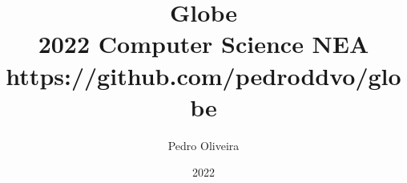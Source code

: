 \documentclass[a4paper,12pt]{book}
\begin{document}
\author{Pedro Oliveira}
\title{
	Globe \\
	\large 2022 Computer Science NEA \\
	\small https://github.com/pedroddvo/globe
}
	
\date{2022}

\let\cleardoublepage=\clearpage

\frontmatter
\maketitle
\tableofcontents

\mainmatter






\backmatter
\end{document}
